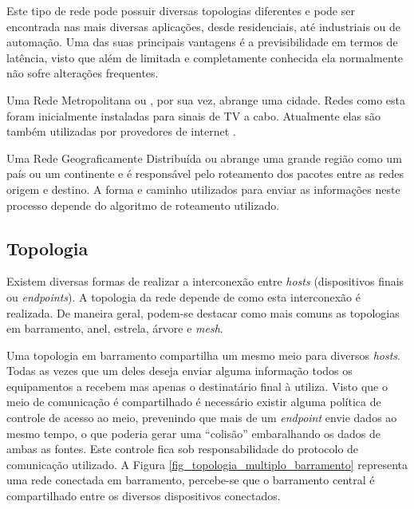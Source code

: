 Este tipo de rede pode possuir diversas topologias diferentes e pode ser encontrada nas mais diversas aplicações, desde residenciais, até industriais ou de automação. Uma das suas principais vantagens é a previsibilidade em termos de latência, visto que além de limitada e completamente conhecida ela normalmente não sofre alterações frequentes.

Uma Rede Metropolitana ou , por sua vez, abrange uma cidade. Redes como esta foram inicialmente instaladas para sinais de TV a cabo. Atualmente elas são também utilizadas por provedores de internet \cite{Book-Tanenbaum2003}.

Uma Rede Geograficamente Distribuída ou  abrange uma grande região como um país ou um continente e é responsável pelo roteamento dos pacotes entre as redes origem e destino. A forma e caminho utilizados para enviar as informações neste processo depende do algoritmo de roteamento utilizado. \cite{Book-Tanenbaum2003}

\subsection{Topologia}
Existem diversas formas de realizar a interconexão entre \emph{hosts} (dispositivos finais ou \emph{endpoints}). A topologia da rede depende de como esta interconexão é realizada. De maneira geral, podem-se destacar como mais comuns as topologias em barramento, anel, estrela, árvore e \emph{mesh}.

Uma topologia em barramento compartilha um mesmo meio para diversos \emph{hosts}. Todas as vezes que um deles deseja enviar alguma informação todos os equipamentos a recebem mas apenas o destinatário final à utiliza. Visto que o meio de comunicação é compartilhado é necessário existir alguma política de controle de acesso ao meio, prevenindo que mais de um \emph{endpoint} envie dados ao mesmo tempo, o que poderia gerar uma ``colisão'' embaralhando os dados de ambas as fontes. Este controle fica sob responsabilidade do protocolo de comunicação utilizado. A Figura \ref{fig_topologia_multiplo_barramento} representa uma rede conectada em barramento, percebe-se que o barramento central é compartilhado entre os diversos dispositivos conectados.


